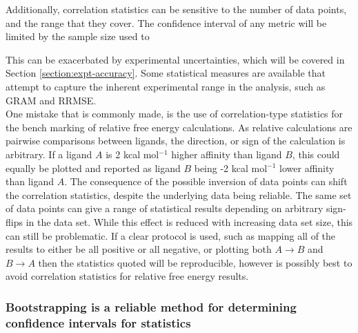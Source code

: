 \documentclass[9pt,bestpractices]{livecoms}
\begin{document}
Additionally, correlation statistics can be sensitive to the number of data points, and the range that they cover. The confidence interval of any metric will be limited by the sample size used to 

This can be exacerbated by experimental uncertainties, which will be covered in Section \ref{section:expt-accuracy}. Some statistical measures are available that attempt to capture the inherent experimental range in the analysis, such as GRAM\cite{} and RRMSE\cite{}.\\

One mistake that is commonly made, is the use of correlation-type statistics for the bench marking of relative free energy calculations. As relative calculations are pairwise comparisons between ligands, the direction, or sign of the calculation is arbitrary. If a ligand $A$ is 2 kcal mol$^{-1}$ higher affinity than ligand $B$, this could equally be plotted and reported as ligand $B$ being -2 kcal mol$^{-1}$ lower affinity than ligand $A$. The consequence of the possible inversion of data points can shift the correlation statistics, despite the underlying data being reliable. The same set of data points can give a range of statistical results depending on arbitrary sign-flips in the data set. While this effect is reduced with increasing data set size, this can still be problematic. If a clear protocol is used, such as mapping all of the results to either be all positive or all negative, or plotting both $A \rightarrow B$ and $B \rightarrow A$ then the statistics quoted will be reproducible, however is possibly best to avoid correlation statistics for relative free energy results.

\subsubsection{Bootstrapping is a reliable method for determining confidence intervals for statistics}
\end{document}
